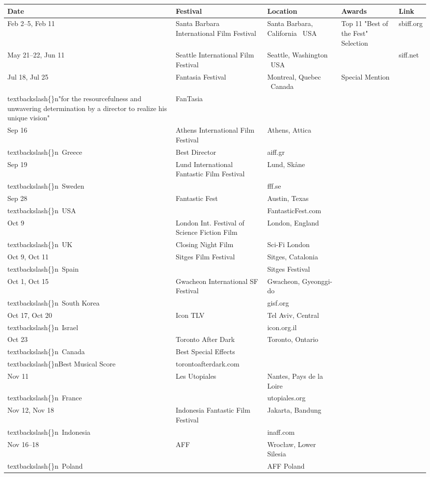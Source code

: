 \documentclass{article}
\begin{document}
\begin{tabular}{lllll}
\toprule
Date & Festival & Location & Awards & Link \\
\midrule
Feb 2–5, Feb 11 & Santa Barbara International Film Festival & Santa Barbara, California  USA & Top 11 "Best of the Fest" Selection & sbiff.org \\
May 21–22, Jun 11 & Seattle International Film Festival & Seattle, Washington  USA &  & siff.net \\
Jul 18, Jul 25 & Fantasia Festival & Montreal, Quebec  Canada & Special Mention\\textbackslash\{\}n"for the resourcefulness and unwavering determination by a director to realize his unique vision" & FanTasia \\
Sep 16 & Athens International Film Festival & Athens, Attica\\textbackslash\{\}n Greece & Best Director & aiff.gr \\
Sep 19 & Lund International Fantastic Film Festival & Lund, Skåne\\textbackslash\{\}n Sweden &  & fff.se \\
Sep 28 & Fantastic Fest & Austin, Texas\\textbackslash\{\}n USA &  & FantasticFest.com \\
Oct 9 & London Int. Festival of Science Fiction Film & London, England\\textbackslash\{\}n UK & Closing Night Film & Sci-Fi London \\
Oct 9, Oct 11 & Sitges Film Festival & Sitges, Catalonia\\textbackslash\{\}n Spain &  & Sitges Festival \\
Oct 1, Oct 15 & Gwacheon International SF Festival & Gwacheon, Gyeonggi-do\\textbackslash\{\}n South Korea &  & gisf.org \\
Oct 17, Oct 20 & Icon TLV & Tel Aviv, Central\\textbackslash\{\}n Israel &  & icon.org.il \\
Oct 23 & Toronto After Dark & Toronto, Ontario\\textbackslash\{\}n Canada & Best Special Effects\\textbackslash\{\}nBest Musical Score & torontoafterdark.com \\
Nov 11 & Les Utopiales & Nantes, Pays de la Loire\\textbackslash\{\}n France &  & utopiales.org \\
Nov 12, Nov 18 & Indonesia Fantastic Film Festival & Jakarta, Bandung\\textbackslash\{\}n Indonesia &  & inaff.com \\
Nov 16–18 & AFF & Wrocław, Lower Silesia\\textbackslash\{\}n Poland &  & AFF Poland \\
\bottomrule
\end{tabular}
\end{document}
